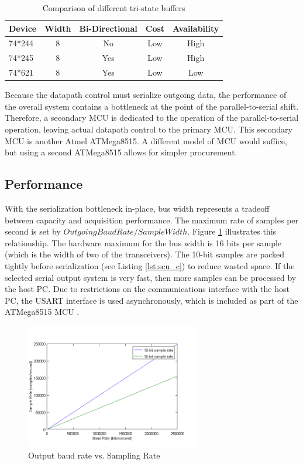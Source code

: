 \begin{table}[bhp]
\caption[Buffer Comparison]{Comparison of different tri-state buffers}
\small
\begin{center}
\begin{tabular}{l| c c c c}
\setlength{\tabcolsep}{1pt}
	Device & Width & Bi-Directional & Cost & Availability \\\hline
	74*244 & 8     & No             & Low  & High\\
	74*245 & 8     & Yes            & Low  & High\\
	74*621 & 8     & Yes            & Low  & Low
\end{tabular}
\end{center}
\label{tab:buffer comparison}
\end{table}

Because the datapath control must serialize outgoing data, the performance
of the overall system contains a bottleneck at the point of the 
parallel-to-serial shift. Therefore, a secondary MCU is dedicated to
the operation of the parallel-to-serial operation, leaving actual datapath 
control to the primary MCU. This secondary MCU is another Atmel ATMega8515. A
different model of MCU would suffice, but using a second ATMega8515 allows  
for simpler procurement.

\subsection{Performance}
With the serialization bottleneck in-place, bus width represents a tradeoff 
between capacity and acquisition performance. The maximum rate of samples per
second is set by ${Outgoing Baud Rate}/{Sample Width}$. Figure \ref{fig:baud rates and sample} 
illustrates this relationship. The hardware maximum for the bus width is 16 bits
per sample (which is the width of two of the transceivers). The 10-bit samples
are packed tightly before serialization (see Listing \ref{lst:scu_c}) to reduce
 wasted space. If the selected serial output system is very fast, then more 
samples can be processed by the host PC. Due to restrictions on the 
communications interface with the host PC, the USART  interface 
is used asynchronously, which is included as part of the ATMega8515 MCU
\cite{ds:ATMEGA8515}.

\begin{figure}[hbp]
\caption[Baud Rate and Samples]{Output baud rate vs. Sampling Rate\cite{ds:ATMEGA8515}}
\begin{center}
\includegraphics[width=3in]{baud_rate.png}
\end{center}
\label{fig:baud rates and sample}
\end{figure}

